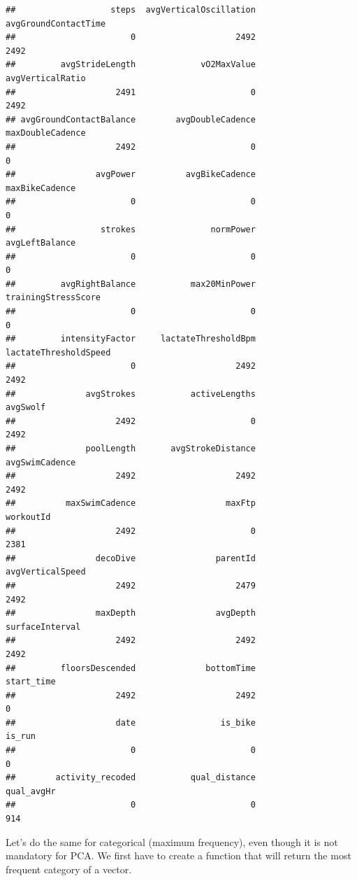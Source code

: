 \documentclass[
]{book}
\begin{document}
\begin{verbatim}
##                   steps  avgVerticalOscillation    avgGroundContactTime 
##                       0                    2492                    2492 
##         avgStrideLength             vO2MaxValue        avgVerticalRatio 
##                    2491                       0                    2492 
## avgGroundContactBalance        avgDoubleCadence        maxDoubleCadence 
##                    2492                       0                       0 
##                avgPower          avgBikeCadence          maxBikeCadence 
##                       0                       0                       0 
##                 strokes               normPower          avgLeftBalance 
##                       0                       0                       0 
##         avgRightBalance           max20MinPower     trainingStressScore 
##                       0                       0                       0 
##         intensityFactor     lactateThresholdBpm   lactateThresholdSpeed 
##                       0                    2492                    2492 
##              avgStrokes           activeLengths                avgSwolf 
##                    2492                       0                    2492 
##              poolLength       avgStrokeDistance          avgSwimCadence 
##                    2492                    2492                    2492 
##          maxSwimCadence                  maxFtp               workoutId 
##                    2492                       0                    2381 
##                decoDive                parentId        avgVerticalSpeed 
##                    2492                    2479                    2492 
##                maxDepth                avgDepth         surfaceInterval 
##                    2492                    2492                    2492 
##         floorsDescended              bottomTime              start_time 
##                    2492                    2492                       0 
##                    date                 is_bike                  is_run 
##                       0                       0                       0 
##        activity_recoded           qual_distance              qual_avgHr 
##                       0                       0                     914
\end{verbatim}

Let's do the same for categorical (maximum frequency), even though it is not mandatory for PCA. We first have to create a function that will return the most frequent category of a vector.
\end{document}
